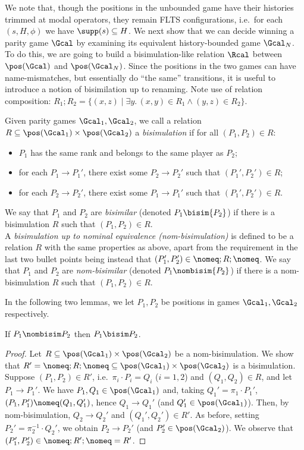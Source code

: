 We note that, though the positions in the unbounded game have their histories trimmed at modal operators, they remain FLTS configurations, i.e.\ for each $(s,H,\phi)$ we have $\supp(s)\subseteq H$. 
We next show that we can decide winning a parity game $\Gcal$ by examining its equivalent history-bounded game $\Gcal_N$.
To do this, we are going to build a bisimulation-like relation $\Rcal$ between $\pos(\Gcal)$ and $\pos(\Gcal_N)$. Since the positions in the two games can have name-mismatches, but essentially do ``the same'' transitions, it is useful to introduce a notion of {bisimilation} up to renaming. Note use of relation composition: $R_1;R_2=\{(x,z)\mid \exists y.\,(x,y)\in R_1\land (y,z)\in R_2\}$.

\begin{definition}
Given parity games $\Gcal_1, \Gcal_2$, we call a relation $R \subseteq \pos(\Gcal_1) \times \pos(\Gcal_2)$ a \emph{bisimulation} if for all $(P_1, P_2) \in R$:
    \begin{itemize}
        \item $P_1$ has the same rank and belongs to the same player as $P_2$;
        \item for each $P_1 \rightarrow P_1'$, there exist some $P_2 \rightarrow P_2'$  such that $(P_1',P_2')\in R$;
        \item for each $P_2 \rightarrow P_2'$, there exist some $P_1 \rightarrow P_1'$ such that $(P_1', P_2') \in R$.
    \end{itemize}
    We say that $P_1$ and $P_2$ are \emph{bisimilar} (denoted ${P_1}\bisim{P_2}$)
    if there is a bisimulation $R$ such that $(P_1, P_2) \in R$. \\
    A \emph{bisimulation up to nominal equivalence (nom-bisimulation)} is defined to be a relation $R$ with the same properties as above, apart from the requirement in the last two bullet points being instead that $(P_1',P_2')\in {\nomeq};R;{\nomeq}$.
    We say that $P_1$ and $P_2$ are \emph{nom-bisimilar} (denoted ${P_1}\nombisim{P_2}$)
    if there is a nom-bisimulation $R$ such that $(P_1, P_2) \in R$. 
\end{definition}

In the following two lemmas, we let $P_1,P_2$ be positions in games $\Gcal_1,\Gcal_2$ respectively.

\begin{lemma}\label{lem:nombisimbisim}
If $P_1\nombisim P_2$ then $P_1\bisim P_2$. \end{lemma}
\begin{proof}
  Let $R\subseteq\pos(\Gcal_1)\times\pos(\Gcal_2)$ be 
  a nom-bisimulation. We show that $R'={\nomeq;R;\nomeq}\subseteq\pos(\Gcal_1)\times\pos(\Gcal_2)$ is a bisimulation.
Suppose $(P_1,P_2)\in R'$, i.e.\ $\pi_i\cdot P_i=Q_i$ ($i=1,2$) and $(Q_1,Q_2)\in R$, and let $P_1\to P_1'$. We have $P_1,Q_1\in\pos(\Gcal_1)$ and, taking $Q_1'=\pi_1\cdot P_1'$, $(P_1,P_1')\nomeq(Q_1,Q_1')$, hence $Q_1\to Q_1'$ (and $Q_1'\in\pos(\Gcal_1)$). Then, by nom-bisimulation, $Q_2\to Q_2'$ and $(Q_1',Q_2')\in R'$. As before, setting $P_2'=\pi_2^{-1}\cdot Q_2'$, we obtain $P_2\to P_2'$ (and $P_2'\in\pos(\Gcal_2)$). We observe that $(P_1',P_2')\in{\nomeq;R';\nomeq}=R'$.
\end{proof}


